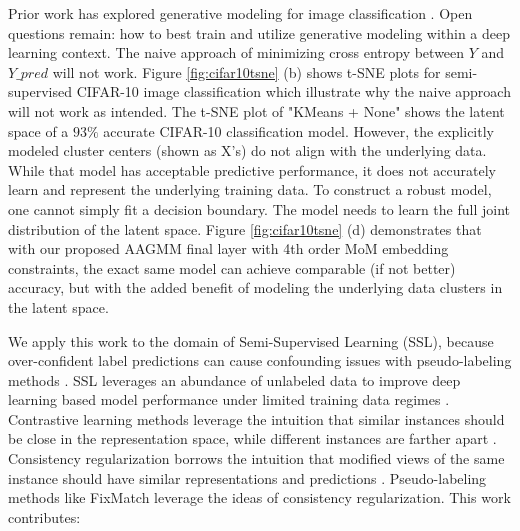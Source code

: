\documentclass[10pt,twocolumn,letterpaper]{article}
\begin{document}
Prior work has explored generative modeling for image classification \cite{li2019disentangled,kingma2013auto,kingma2019introduction}.
Open questions remain: how to best train and utilize generative modeling within a deep learning context.
The naive approach of minimizing cross entropy between $Y$ and $Y\_pred$ will not work.
Figure \ref{fig:cifar10tsne} (b) shows t-SNE plots for semi-supervised CIFAR-10 \cite{cifar10} image classification which illustrate why the naive approach will not work as intended. 
The t-SNE \cite{tsne} plot of "KMeans + None" shows the latent space of a $93\%$ accurate CIFAR-10 classification model. 
However, the explicitly modeled cluster centers (shown as X's) do not align with the underlying data.
While that model has acceptable predictive performance, it does not accurately learn and represent the underlying training data.
To construct a robust model, one cannot simply fit a decision boundary.
The model needs to learn the full joint distribution of the latent space. 
Figure \ref{fig:cifar10tsne} (d) demonstrates that with our proposed AAGMM final layer with 4th order MoM embedding constraints, the exact same model can achieve comparable (if not better) accuracy, but with the added benefit of modeling the underlying data clusters in the latent space.


We apply this work to the domain of Semi-Supervised Learning (SSL), because over-confident label predictions can cause confounding issues with pseudo-labeling methods \cite{arazo2020pseudo}.
SSL leverages an abundance of unlabeled data to improve deep learning based model performance under limited training data regimes \cite{zhu2022introduction,li2019safe,hady2013semi}.
Contrastive learning methods leverage the intuition that similar instances should be close in the representation space, while different instances are farther apart \cite{yang2022class,li2021comatch}.
Consistency regularization borrows the intuition that modified views of the same instance should have similar representations and predictions \cite{sohn2020fixmatch,lee2022contrastive,zhang2021flexmatch,kim2022conmatch}.
Pseudo-labeling methods like FixMatch \cite{sohn2020fixmatch} leverage the ideas of consistency regularization.
This work contributes:
\end{document}
